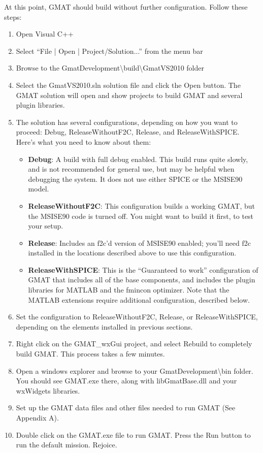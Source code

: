 \documentclass[letterpaper,10pt]{article}%
\begin{document}
At this point, GMAT should build without further configuration.  Follow these steps:
\begin{enumerate}
\item Open Visual C++
\item Select ``File | Open | Project/Solution...'' from the menu bar
\item Browse to the GmatDevelopment\textbackslash build\textbackslash GmatVS2010 folder
\item Select the GmatVS2010.sln solution file and click the Open button.  The GMAT solution will open and show projects to build GMAT and several plugin libraries.
\item The solution has several configurations, depending on how you want to proceed: Debug, ReleaseWithoutF2C, Release, and ReleaseWithSPICE.  Here's what you need to know about them:
\begin{itemize}
\item \textbf{Debug}:  A build with full debug enabled.  This build runs quite slowly, and is not recommended for general use, but may be helpful when debugging the system.  It does not use either SPICE or the MSISE90 model.
\item \textbf{ReleaseWithoutF2C}: This configuration builds a working GMAT, but the MSISE90 code is turned off.  You might want to build it first, to test your setup.
\item \textbf{Release}: Includes an f2c'd version of MSISE90 enabled; you'll need f2c installed in the locations described above to use this configuration.
\item \textbf{ReleaseWithSPICE}: This is the ``Guaranteed to work'' configuration of GMAT that includes all of the base components, and includes the plugin libraries for MATLAB and the fmincon optimizer.  Note that the MATLAB extensions require additional configuration, described below.
\end{itemize}
\item Set the configuration to ReleaseWithoutF2C, Release, or ReleaseWithSPICE, depending on the elements installed in previous sections.
\item Right click on the GMAT\_wxGui project, and select Rebuild to completely build GMAT.  This process takes a few minutes.  
\item Open a windows explorer and browse to your GmatDevelopment\textbackslash bin folder.  You should see GMAT.exe there, along with libGmatBase.dll and your wxWidgets libraries.
\item Set up the GMAT data files and other files needed to run GMAT (See Appendix A).
\item Double click on the GMAT.exe file to run GMAT.  Press the Run button to run the default mission.  Rejoice.
\end{enumerate}
\end{document}
